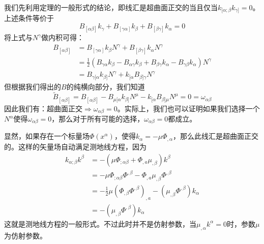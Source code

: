 \documentclass[hyperref, UTF8, a4paper]{ctexart}
\begin{document}
我们先利用定理的一般形式的结论，即线汇是超曲面正交的当且仅当$k_{[ \alpha ;\beta } k_{\gamma ]} =0$。上述条件等价于
\begin{equation*}
	B_{[ \alpha \beta ]} k_{\gamma } +B_{[ \gamma \alpha ]} k_{\beta } +B_{[ \beta \gamma ]} k_{\alpha } =0
\end{equation*}
将上式与$N^{\gamma }$做内积可得：
\begin{equation*}
	\begin{aligned}
		B_{[\alpha \beta ]} & =B_{[\gamma \alpha ]} k_{\beta } N^{\gamma } +B_{[\beta \gamma ]} k_{\alpha } N^{\gamma }\\
		& =\frac{1}{2}( B_{\gamma \alpha } k_{\beta } -B_{\alpha \gamma } k_{\beta } +B_{\beta \gamma } k_{\alpha } -B_{\gamma \beta } k_{\alpha }) N^{\gamma }\\
		& =B_{\gamma [\alpha } k_{\beta ]} N^{\gamma } +k_{[\alpha } B_{\beta ]\gamma } N^{\gamma }
	\end{aligned}
\end{equation*}
但根据我们得出的$B$的纯横向部分，我们知道
\begin{equation*}
	\tilde{B}_{[\alpha \beta ]} =B_{[\alpha \beta ]} -B_{\mu [\alpha } k_{\beta ]} N^{\mu } -k_{[\alpha } B_{\beta ]\mu } N^{\mu } =0=\omega _{\alpha \beta }
\end{equation*}
因此我们有：超曲面正交$\Rightarrow \omega _{\alpha \beta } =0$。实际上，我们也可以证明如果我们选择一个$N^{\alpha }$使得$\omega _{\alpha \beta } =0$，那么对于所有可能的选择，$\omega _{\alpha \beta } =0$都成立。



显然，如果存在一个标量场$\Phi (x^{\alpha } )$，使得$k_{\alpha } =-\mu \Phi _{,\alpha }$，那么此线汇是超曲面正交的。这样的矢量场自动满足测地线方程，因为
\begin{equation*}
	\begin{aligned}
		k_{\alpha ;\beta } k^{\beta } & =-( \mu \Phi _{;\alpha \beta } +\Phi _{,a} \mu _{,\beta }) k^{\beta }\\
		& =-\mu \Phi _{;\alpha \beta } \Phi ^{,\beta } -\Phi _{,a} \mu _{,\beta } \Phi ^{,\beta }\\
		& =-\frac{1}{2} \mu (\Phi _{,\beta } \Phi ^{,\beta } )_{,a} -(\mu _{,\beta } \Phi ^{,\beta } )k_{\alpha }\\
		& =-(\mu _{,\beta } \Phi ^{,\beta } )k_{\alpha }
	\end{aligned}
\end{equation*}
这就是测地线方程的一般形式。不过此时并不是仿射参数，当$\mu _{,\alpha } k^{\alpha } =0$时，参数$\mu $为仿射参数。
\end{document}
